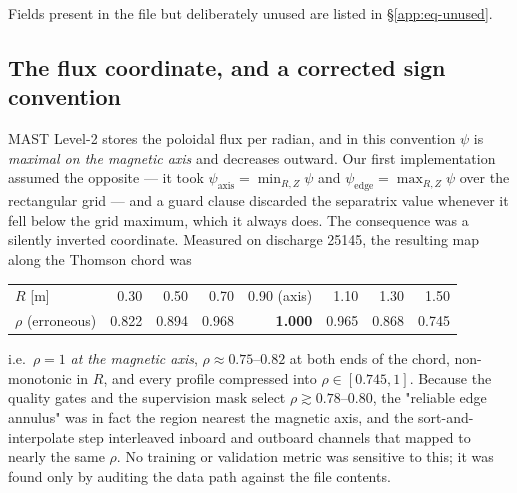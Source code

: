 Fields present in the file but deliberately unused are listed in
\S\ref{app:eq-unused}.

\subsection{The flux coordinate, and a corrected sign convention}
\label{app:eq-rho}

MAST Level-2 stores the poloidal flux per radian, and in this convention
$\psi$ is \emph{maximal on the magnetic axis} and decreases outward. Our
first implementation assumed the opposite --- it took
$\psi_{\mathrm{axis}} = \min_{R,Z}\psi$ and
$\psi_{\mathrm{edge}} = \max_{R,Z}\psi$ over the rectangular grid --- and a
guard clause discarded the separatrix value whenever it fell below the grid
maximum, which it always does. The consequence was a silently inverted
coordinate. Measured on discharge 25145, the resulting map along the
Thomson chord was

\begin{center}\small
\begin{tabular}{lrrrrrrr}
\toprule
$R$ [m] & 0.30 & 0.50 & 0.70 & 0.90 (axis) & 1.10 & 1.30 & 1.50 \\
$\rho$ (erroneous) & 0.822 & 0.894 & 0.968 & \textbf{1.000} & 0.965 & 0.868 & 0.745 \\
\bottomrule
\end{tabular}
\end{center}

i.e.\ $\rho = 1$ \emph{at the magnetic axis}, $\rho \approx 0.75$--$0.82$ at
both ends of the chord, non-monotonic in $R$, and every profile compressed
into $\rho \in [0.745, 1]$. Because the quality gates and the supervision
mask select $\rho \gtrsim 0.78$--$0.80$, the "reliable edge annulus" was in
fact the region nearest the magnetic axis, and the sort-and-interpolate step
interleaved inboard and outboard channels that mapped to nearly the same
$\rho$. No training or validation metric was sensitive to this; it was
found only by auditing the data path against the file contents.

